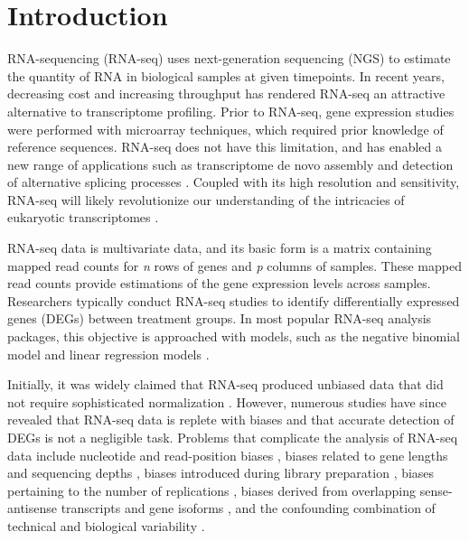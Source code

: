 \documentclass{bioinfo}
\begin{document}
\maketitle

\section{Introduction}

RNA-sequencing (RNA-seq) uses next-generation sequencing (NGS) to estimate the quantity of RNA in biological samples at given timepoints. In recent years, decreasing cost and increasing throughput has rendered RNA-seq an attractive alternative to transcriptome profiling. Prior to RNA-seq, gene expression studies were performed with microarray techniques, which required prior knowledge of reference sequences. RNA-seq does not have this limitation, and has enabled a new range of applications such as transcriptome de novo assembly \citep{Robertson} and detection of alternative splicing processes \citep{Anders2012, Pan}. Coupled with its high resolution and sensitivity, RNA-seq will likely revolutionize our understanding of the intricacies of eukaryotic transcriptomes \citep{Wang, Zhao}.

RNA-seq data is multivariate data, and its basic form is a matrix containing mapped read counts for \textit{n} rows of genes and \textit{p} columns of samples. These mapped read counts provide estimations of the gene expression levels across samples. Researchers typically conduct RNA-seq studies to identify differentially expressed genes (DEGs) between treatment groups. In most popular RNA-seq analysis packages, this objective is approached with models, such as the negative binomial model \citep{Anders2010, Trapnell2012, Trapnell2013, Robinson} and linear regression models \citep{Law}.

Initially, it was widely claimed that RNA-seq produced unbiased data that did not require sophisticated normalization \citep{Wang, Morin, Marioni}. However, numerous studies have since revealed that RNA-seq data is replete with biases and that accurate detection of DEGs is not a negligible task. Problems that complicate the analysis of RNA-seq data include nucleotide and read-position biases \citep{Hansen}, biases related to gene lengths and sequencing depths \citep{Oshlack, RobinsonOshlack}, biases introduced during library preparation \citep{McIntyre}, biases pertaining to the number of replications \citep{Schurch}, biases derived from overlapping sense-antisense transcripts and gene isoforms \citep{Trapnell2013}, and the confounding combination of technical and biological variability \citep{Bullard}.
\end{document}
